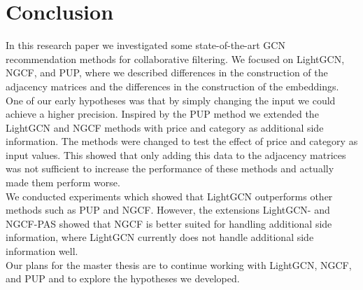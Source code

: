 \section{Conclusion}\label{sec:conclusion}
In this research paper we investigated some state-of-the-art GCN recommendation methods for collaborative filtering.
We focused on LightGCN, NGCF, and PUP, where we described differences in the construction of the adjacency matrices and the differences in the construction of the embeddings.
\\
One of our early hypotheses was that by simply changing the input we could achieve a higher precision.
Inspired by the PUP method we extended the LightGCN and NGCF methods with price and category as additional side information.
The methods were changed to test the effect of price and category as input values.
This showed that only adding this data to the adjacency matrices was not sufficient to increase the performance of these methods and actually made them perform worse.
\\
We conducted experiments which showed that LightGCN outperforms other methods such as PUP and NGCF.
However, the extensions LightGCN- and NGCF-PAS showed that NGCF is better suited for handling additional side information, where LightGCN currently does not handle additional side information well.
\\
Our plans for the master thesis are to continue working with LightGCN, NGCF, and PUP and to explore the hypotheses we developed.
